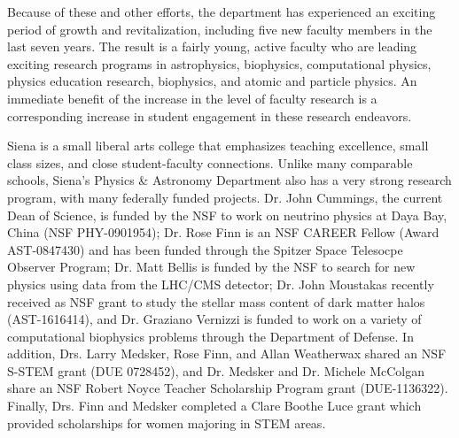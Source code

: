 \documentclass[11pt, preprint]{aastex}
\begin{document}
Because of these and other efforts, the department has experienced an exciting
period of growth and revitalization, including five new faculty members in the
last seven years.  The result is a fairly young, active faculty who are leading
exciting research programs in astrophysics, biophysics, computational physics,
physics education research, biophysics, and atomic and particle physics. An
immediate benefit of the increase in the level of faculty research is a
corresponding increase in student engagement in these research endeavors.


				
Siena is a small liberal arts college that emphasizes teaching excellence, small
class sizes, and close student-faculty connections. Unlike many comparable
schools, Siena's Physics \& Astronomy Department also has a very strong research
program, with many federally funded projects. Dr. John Cummings, the current
Dean of Science, is funded by the NSF to work on neutrino physics at Daya Bay,
China (NSF PHY-0901954); Dr. Rose Finn is an NSF CAREER Fellow (Award
AST-0847430) and has been funded through the Spitzer Space Telesocpe
Observer Program;
Dr. Matt Bellis is funded by the NSF to search for new physics using data from
the LHC/CMS detector; Dr. John Moustakas recently received as NSF
grant to study the stellar mass content of dark matter halos
(AST-1616414), and Dr. Graziano Vernizzi is funded to work on a variety
of computational biophysics problems through the Department of Defense.  In
addition, Drs. Larry Medsker, Rose Finn, and Allan Weatherwax shared an NSF
S-STEM grant (DUE 0728452), and Dr. Medsker and Dr. Michele McColgan share an
NSF Robert Noyce Teacher Scholarship Program grant (DUE-1136322).  Finally,
Drs. Finn and Medsker completed a Clare Boothe Luce grant which
provided scholarships for women majoring in STEM areas.
\end{document}
